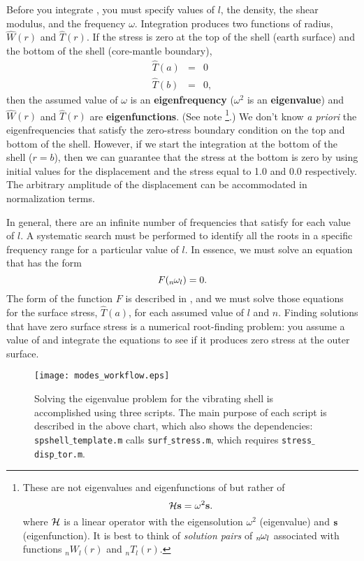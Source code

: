 \documentclass[11pt,titlepage,fleqn]{article}
\newcommand{\Tnl}{\mbox{${}_nT_l$}}   %
\newcommand{\Wnl}{\mbox{${}_nW_l$}}   %
\newcommand{\omnl}{\mbox{${}_{n\hspace{-0.2 mm}}\omega_l$}}  %
\begin{document}
Before you integrate , you must specify values of $l$, the density, the shear modulus, and the frequency $\omega$. Integration produces two functions of radius, $\hat{W}(r)$ and $\hat{T}(r)$. If the stress is zero at the top of the shell (earth surface) and the bottom of the shell (core-mantle boundary),
%
\begin{eqnarray}
\hat{T}(a) &=& 0
\\
\hat{T}(b) &=& 0,
\end{eqnarray}
%
then the assumed value of $\omega$ is an {\bf eigenfrequency} ($\omega^2$ is an {\bf eigenvalue}) and  $\hat{W}(r)$ and $\hat{T}(r)$ are {\bf eigenfunctions}.
(See note \footnote{These are not eigenvalues and eigenfunctions of  but rather of \citep[][Eq.~4.8-4.9]{DT}
%
\begin{equation*}
{\boldmath \cal H} \mbox{${\bf s}$} = \omega^2 \mbox{${\bf s}$}.
\end{equation*}
%
where ${\boldmath \cal H}$ is a linear operator with the eigensolution $\omega^2$ (eigenvalue) and $\mbox{${\bf s}$}$ (eigenfunction). It is best to think of {\em solution pairs} of $\omnl$ associated with functions $\Wnl(r)$ and $\Tnl(r)$.}.)
We don't know {\em a priori} the eigenfrequencies that satisfy the zero-stress boundary condition on the top and bottom of the shell. However, if we start the integration at the bottom of the shell ($r = b$), then we can guarantee that the stress at the bottom is zero by using initial values for the displacement and the stress equal to 1.0 and 0.0 respectively. The arbitrary amplitude of the displacement can be accommodated in normalization terms.

In general, there are an infinite number of frequencies that satisfy  for each value of $l$. A systematic search must be performed to identify all the roots in a specific frequency range for a particular value of $l$. In essence, we must solve an equation that has the form
%
\begin{equation}
F(\omnl) = 0.
\end{equation}
%
The form of the function $F$ is described in , and we must solve those equations for the surface stress, $\hat{T}(a)$, for each assumed value of $l$ and $n$. Finding solutions that have zero surface stress is a numerical root-finding problem: you assume a value of and integrate the equations to see if it produces zero stress at the outer surface.


\begin{figure}[h]
\centering
\texttt{[image: modes\_workflow.eps]}
\caption[]
{{
Solving the eigenvalue problem for the vibrating shell is accomplished using three scripts. The main purpose of each script is described in the above chart, which also shows the dependencies: {\tt spshell$\_$template.m} calls {\tt surf$\_$stress.m}, which requires {\tt stress$\_$disp$\_$tor.m}.
\label{fig:workflow}
}}
\end{figure}
\end{document}
